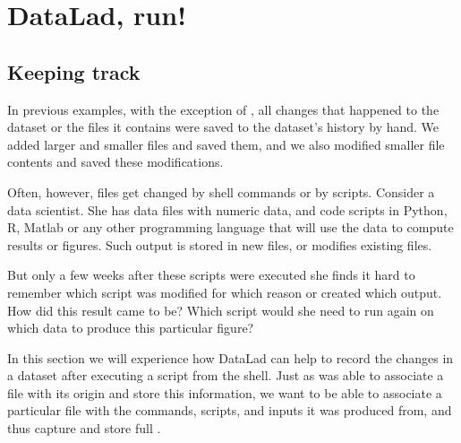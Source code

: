 \chapter{DataLad, run!}
\label{\detokenize{basics/basics-run:datalad-run}}\label{\detokenize{basics/basics-run:chapter-run}}\label{\detokenize{basics/basics-run:id1}}\label{\detokenize{basics/basics-run::doc}}

\sphinxstepscope


\section{Keeping track}
\label{\detokenize{basics/101-108-run:keeping-track}}\label{\detokenize{basics/101-108-run:run}}\label{\detokenize{basics/101-108-run::doc}}
\sphinxAtStartPar
In previous examples, with the exception of , all
changes that happened to the dataset or the files it contains were
saved to the dataset’s history by hand. We added larger and smaller
files and saved them, and we also modified smaller file contents and
saved these modifications.

\sphinxAtStartPar
Often, however, files get changed by shell commands
or by scripts.
Consider a data scientist.
She has data files with numeric data,
and code scripts in Python, R, Matlab or any other programming language
that will use the data to compute results or figures. Such output is
stored in new files, or modifies existing files.

\sphinxAtStartPar
But only a few weeks after these scripts were executed she finds it hard
to remember which script was modified for which reason or created which
output. How did this result came to be? Which script would she need
to run again on which data to produce this particular figure?

\sphinxAtStartPar
In this section we will experience how DataLad can help
to record the changes in a dataset after executing a script
from the shell. Just as  was able to associate
a file with its origin and store this information, we want to be
able to associate a particular file with the commands, scripts, and inputs
it was produced from, and thus capture and store full {\hyperref[\detokenize{glossary:term-provenance}]{}}.

